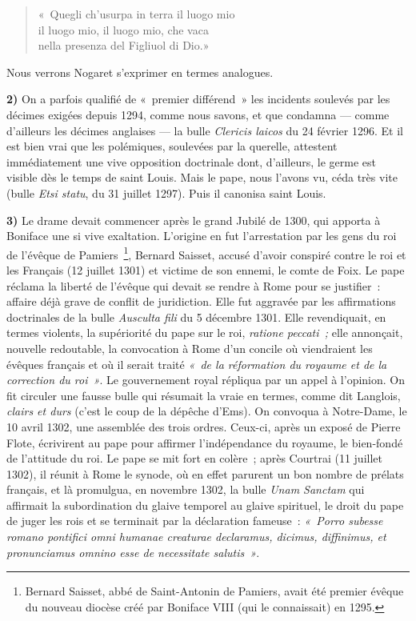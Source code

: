 \documentclass[french,twoside]{book} %
\newcommand{\labelchar}[1]{\textbf{\color{rubric} #1}}
\begin{document}
\begin{verse}
« Quegli ch’usurpa in terra il luogo mio\\
il luogo mio, il luogo mio, che vaca\\
nella presenza del Figliuol di Dio.»\\
\end{verse}

\noindent Nous verrons Nogaret s’exprimer en termes analogues.\par
\bigbreak
\noindent \labelchar{2)} On a parfois qualifié de « premier différend » les incidents soulevés par les décimes exigées depuis 1294, comme nous savons, et que condamna — comme d’ailleurs les décimes anglaises — la bulle {\itshape Clericis laicos} du 24 février 1296. Et il est bien vrai que les polémiques, soulevées par la querelle, attestent immédiatement une vive opposition doctrinale dont, d’ailleurs, le germe est visible dès le temps de saint Louis. Mais le pape, nous l’avons vu, céda très vite (bulle {\itshape Etsi statu}, du 31 juillet 1297). Puis il canonisa saint Louis.\par
\par
\bigbreak
\noindent \labelchar{3)} Le drame devait commencer après le grand Jubilé de 1300, qui apporta à Boniface une si vive exaltation. L’origine en fut l’arrestation par les gens du roi de l’évêque de Pamiers \footnote{Bernard Saisset, abbé de Saint-Antonin de Pamiers, avait été premier évêque du nouveau diocèse créé par Boniface VIII (qui le connaissait) en 1295.}, Bernard Saisset, accusé d’avoir conspiré contre le roi et les Français (12 juillet 1301) et victime de son ennemi, le comte de Foix. Le pape réclama la liberté de l’évêque qui devait se rendre à Rome pour se justifier : affaire déjà grave de conflit de juridiction. Elle fut aggravée par les affirmations doctrinales de la bulle {\itshape Ausculta fili} du 5 décembre 1301. Elle revendiquait, en termes violents, la supériorité du pape sur le roi, {\itshape ratione peccati ;} elle annonçait, nouvelle redoutable, la convocation à Rome d’un concile où viendraient les évêques français et où il serait traité \emph{« de la réformation du royaume et de la correction du roi »}. Le gouvernement royal répliqua par un appel à l’opinion. On fit circuler une fausse bulle qui résumait la vraie en termes, comme dit Langlois, \emph{clairs et  
\label{p52} durs} (c’est le coup de la dépêche d’Ems). On convoqua à Notre-Dame, le 10 avril 1302, une assemblée des trois ordres. Ceux-ci, après un exposé de Pierre Flote, écrivirent au pape pour affirmer l’indépendance du royaume, le bien-fondé de l’attitude du roi. Le pape se mit fort en colère ; après Courtrai (11 juillet 1302), il réunit à Rome le synode, où en effet parurent un bon nombre de prélats français, et là promulgua, en novembre 1302, la bulle {\itshape Unam Sanctam} qui affirmait la subordination du glaive temporel au glaive spirituel, le droit du pape de juger les rois et se terminait par la déclaration fameuse : \emph{« Porro subesse romano pontifici omni humanae creaturae declaramus, dicimus, diffinimus, et pronunciamus omnino esse de necessitate salutis »}.\par
\end{document}
